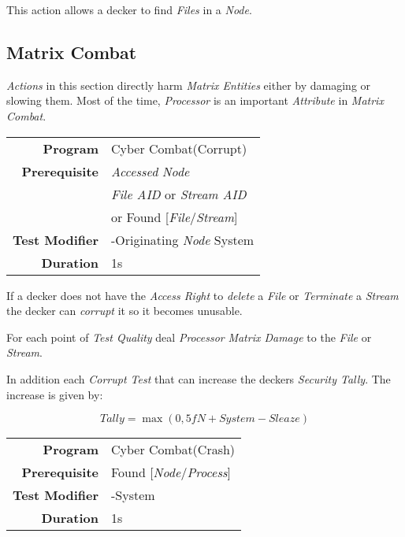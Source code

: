 \hfill

This action allows a decker to find \emph{Files} in a \emph{Node}.

\subsection{Matrix Combat}
\label{subsec:matrix combat}

\emph{Actions} in this section directly harm \emph{Matrix Entities} either by
damaging or slowing them. Most of the time, \emph{Processor} is an important
\emph{Attribute} in \emph{Matrix Combat}.

\label{par:corrupt action}

\begin{tabular}{rl}
    \textbf{Program}       & Cyber Combat(Corrupt)                \\
    \textbf{Prerequisite}  & \emph{Accessed} \emph{Node}          \\
                           & \emph{File AID} or \emph{Stream AID} \\
                           & or Found [\emph{File}/\emph{Stream}] \\
    \textbf{Test Modifier} & -Originating \emph{Node} System      \\
    \textbf{Duration}      & 1s                                   \\
\end{tabular}

\hfill

If a decker does not have the \emph{Access Right} to \emph{delete} a \emph{File}
or \emph{Terminate} a \emph{Stream} the decker can \emph{corrupt} it so it becomes
unusable.

For each point of \emph{Test Quality} deal \emph{Processor} \emph{Matrix Damage}
to the \emph{File} or \emph{Stream}.

In addition each \emph{Corrupt Test} that can increase the deckers
\emph{Security Tally}.
The increase is given by:

\begin{equation*}
    \textit{Tally} = \max(0, \textit{5fN} + \textit{System} - \textit{Sleaze})
\end{equation*}

\label{par:crash}

\begin{tabular}{rl}
    \textbf{Program}       & Cyber Combat(Crash)                \\
    \textbf{Prerequisite}  & Found [\emph{Node}/\emph{Process}] \\
    \textbf{Test Modifier} & -System                            \\
    \textbf{Duration}      & 1s                                 \\
\end{tabular}

